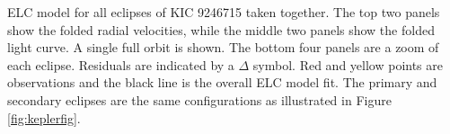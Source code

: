 \label{fig:ELCresult} ELC model for all eclipses of KIC 9246715 taken together. The top two panels show the folded radial velocities, while the middle two panels show the folded light curve. A single full orbit is shown. The bottom four panels are a zoom of each eclipse. Residuals are indicated by a $\Delta$ symbol. Red and yellow points are observations and the black line is the overall ELC model fit. The primary and secondary eclipses are the same configurations as illustrated in Figure \ref{fig:keplerfig}.